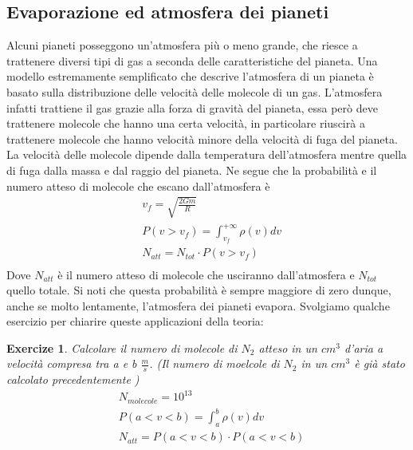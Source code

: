 \documentclass[10pt,a4paper]{article}
\newtheorem{exercize}{Exercize}
\begin{document}
\subsection{Evaporazione ed atmosfera dei pianeti}
Alcuni pianeti posseggono un'atmosfera più o meno grande, che riesce a trattenere diversi tipi di gas a seconda delle caratteristiche del pianeta. Una modello estremamente semplificato che descrive l'atmosfera di un pianeta è basato sulla distribuzione delle velocità delle molecole di un gas. L'atmosfera infatti trattiene il gas grazie alla forza di gravità del pianeta, essa però deve trattenere molecole che hanno una certa velocità, in particolare riuscirà a trattenere molecole che hanno velocità minore della velocità di fuga del pianeta. La velocità delle molecole dipende dalla temperatura dell'atmosfera mentre quella di fuga dalla massa e dal raggio del pianeta. Ne segue che la probabilità e il numero atteso di molecole che escano dall'atmosfera è
\begin{align*}
	&v_f = \sqrt{\frac{2 G m}{R}}\\
	&P(v > v_f) = \int_{v_f}^{+\infty}\rho(v)dv\\
	&N_{att} = N_{tot} \cdot P(v > v_f)\\
\end{align*}
Dove $N_{att}$ è il numero atteso di molecole che usciranno dall'atmosfera e $N_{tot}$ quello totale. Si noti che questa probabilità è sempre maggiore di zero dunque, anche se molto lentamente, l'atmosfera dei pianeti evapora. Svolgiamo qualche esercizio per chiarire queste applicazioni della teoria:
\begin{exercize}
	Calcolare il numero di molecole di $N_2$ atteso in un $cm^3$ d'aria a velocità compresa tra a e b $\frac{m}{s}$. (Il numero di moelcole di $N_2$ in un $cm^3$ è già stato calcolato precedentemente )
	\begin{align*}
		&N_{molecole} = 10^{13}\\
		&P(a<v<b) = \int_{a}^{b}\rho(v)dv\\
		&N_{att}=P(a<v<b)\cdot P(a<v<b) 
	\end{align*}
\end{exercize}
\end{document}
